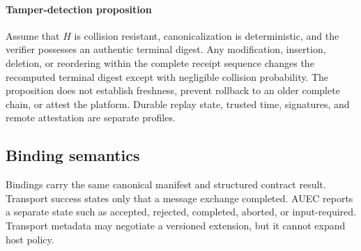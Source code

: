 \paragraph{Tamper-detection proposition}
Assume that $H$ is collision resistant, canonicalization is deterministic, and the verifier possesses an authentic terminal digest. Any modification, insertion, deletion, or reordering within the complete receipt sequence changes the recomputed terminal digest except with negligible collision probability. The proposition does not establish freshness, prevent rollback to an older complete chain, or attest the platform. Durable replay state, trusted time, signatures, and remote attestation are separate profiles.

\subsection{Binding semantics}
Bindings carry the same canonical manifest and structured contract result. Transport success states only that a message exchange completed. AUEC reports a separate state such as accepted, rejected, completed, aborted, or input-required. Transport metadata may negotiate a versioned extension, but it cannot expand host policy.
